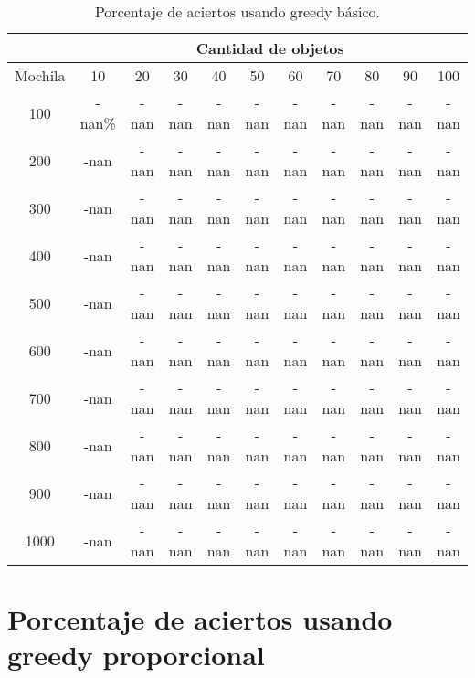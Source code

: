 \documentclass[a4paper]{article}
\begin{document}
\begin{table}[H]
\centering
\relax
\resizebox{\textwidth}{!} {%
\begin{tabular}{|c|c|c|c|c|c|c|c|c|c|c|}
\cline{2-11}
 \multicolumn{1}{c}{} & \multicolumn{10}{|c|}{\textbf{Cantidad de objetos}} \\
\hline
Mochila & 10 & 20 & 30 & 40 & 50 & 60 & 70 & 80 & 90 & 100 \\
\hline
\hline
100 & -nan\% & -nan & -nan & -nan & -nan & -nan & -nan & -nan & -nan & -nan \\
\hline
\hline
200 & -nan & -nan & -nan & -nan & -nan & -nan & -nan & -nan & -nan & -nan \\
\hline
\hline
300 & -nan & -nan & -nan & -nan & -nan & -nan & -nan & -nan & -nan & -nan \\
\hline
\hline
400 & -nan & -nan & -nan & -nan & -nan & -nan & -nan & -nan & -nan & -nan \\
\hline
\hline
500 & -nan & -nan & -nan & -nan & -nan & -nan & -nan & -nan & -nan & -nan \\
\hline
\hline
600 & -nan & -nan & -nan & -nan & -nan & -nan & -nan & -nan & -nan & -nan \\
\hline
\hline
700 & -nan & -nan & -nan & -nan & -nan & -nan & -nan & -nan & -nan & -nan \\
\hline
\hline
800 & -nan & -nan & -nan & -nan & -nan & -nan & -nan & -nan & -nan & -nan \\
\hline
\hline
900 & -nan & -nan & -nan & -nan & -nan & -nan & -nan & -nan & -nan & -nan \\
\hline
\hline
1000 & -nan & -nan & -nan & -nan & -nan & -nan & -nan & -nan & -nan & -nan \\
\hline
\end{tabular}%
}
\caption{Porcentaje de aciertos usando greedy básico.}
\end{table}
\section{Porcentaje de aciertos usando greedy proporcional}
\end{document}

